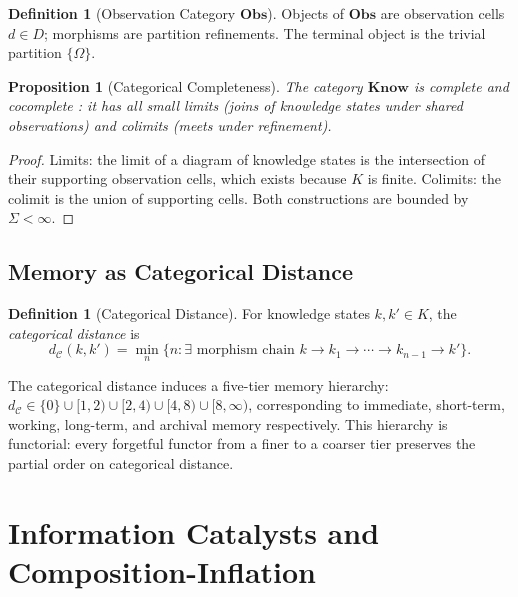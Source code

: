 \documentclass[twocolumn,11pt,a4paper]{article}
\theoremstyle{plain}
\newtheorem{proposition}[theorem]{Proposition}
\theoremstyle{definition}
\newtheorem{definition}[theorem]{Definition}
\theoremstyle{remark}
\begin{document}
\begin{definition}[Observation Category $\mathbf{Obs}$]
Objects of $\mathbf{Obs}$ are observation cells $d \in D$; morphisms are partition refinements.  The terminal object is the trivial partition $\{{\Omega}\}$.
\end{definition}

\begin{proposition}[Categorical Completeness]
\label{prop:cat_complete}
The category $\mathbf{Know}$ is complete and cocomplete \citep{maclane1998}: it has all small limits (joins of knowledge states under shared observations) and colimits (meets under refinement).
\end{proposition}

\begin{proof}
Limits: the limit of a diagram of knowledge states is the intersection of their supporting observation cells, which exists because $K$ is finite.  Colimits: the colimit is the union of supporting cells.  Both constructions are bounded by $\Sigma < \infty$.
\end{proof}

\subsection{Memory as Categorical Distance}

\begin{definition}[Categorical Distance]
\label{def:catdist}
For knowledge states $k, k' \in K$, the \emph{categorical distance} is
\begin{equation}
  d_{\mathcal{C}}(k,k') = \min_{n}\{n : \exists \text{ morphism chain } k \to k_1 \to \cdots \to k_{n-1} \to k'\}.
\end{equation}
\end{definition}

The categorical distance induces a five-tier memory hierarchy:
$d_{\mathcal{C}} \in \{0\} \cup [1,2) \cup [2,4) \cup [4,8) \cup [8,\infty)$, corresponding to immediate, short-term, working, long-term, and archival memory respectively.  This hierarchy is functorial: every forgetful functor from a finer to a coarser tier preserves the partial order on categorical distance.

\section{Information Catalysts and Composition-Inflation}
\label{sec:catalysts}
\end{document}
